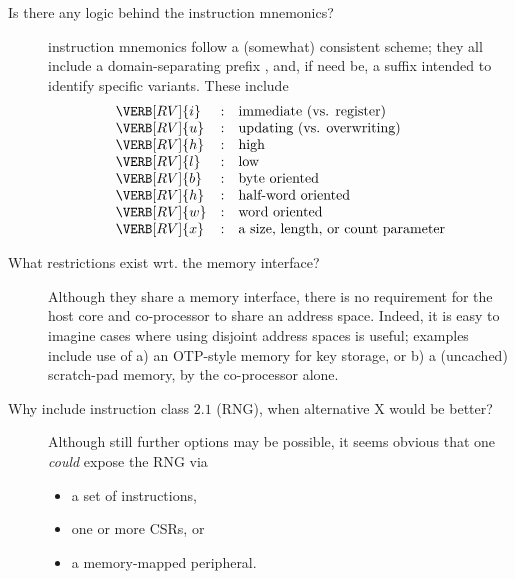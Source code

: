 
%
%
%
%


\begin{description}

\item[Is there any logic behind the \XCID instruction mnemonics?]
      \XCID instruction mnemonics follow a (somewhat) consistent scheme; 
      they all include a domain-separating prefix , and, if
      need be, a suffix intended to identify specific variants.  These 
      include
      \[
      \begin{array}{lcl}
      \VERB[RV]{i} &:& \mbox{immediate (vs. register)   }        \\
      \VERB[RV]{u} &:& \mbox{updating  (vs. overwriting)}        \\
      \VERB[RV]{h} &:& \mbox{high}                               \\
      \VERB[RV]{l} &:& \mbox {low}                               \\
      \VERB[RV]{b} &:& \mbox     {byte oriented}                 \\
      \VERB[RV]{h} &:& \mbox{half-word oriented}                 \\
      \VERB[RV]{w} &:& \mbox     {word oriented}                 \\
      \VERB[RV]{x} &:& \mbox{a size, length, or count parameter} \\
      \end{array}
      \]

\item[What restrictions exist wrt. the \XCID memory interface?]
      Although they share a memory interface, there is no requirement for
      the host core and co-processor to share an address space.  Indeed,
      it is easy to imagine cases where using disjoint address spaces is
      useful; examples include use of
      a) an OTP-style memory for key storage, 
         or
      b) a (uncached) scratch-pad memory,
      by the co-processor alone.


\item[Why include instruction class $2.1$ (RNG), when alternative X would be better?]
      Although still further options may be possible, it seems obvious
      that one {\em could} expose the RNG via

      \begin{itemize}
      \item a set of instructions,
      \item one or more CSRs,
            or
      \item a memory-mapped peripheral.
      \end{itemize}


\end{description}
